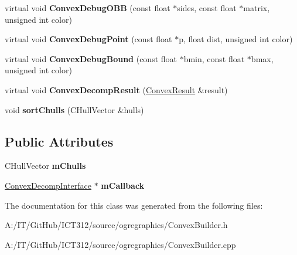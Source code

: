 \begin{DoxyCompactItemize}
\item 
\hypertarget{class_convex_builder_afb3bd186b8c5474987a8802fa3862207}{virtual void {\bfseries Convex\-Debug\-O\-B\-B} (const float $\ast$sides, const float $\ast$matrix, unsigned int color)}\label{class_convex_builder_afb3bd186b8c5474987a8802fa3862207}

\item 
\hypertarget{class_convex_builder_a27c203170b0517f2cafa230e668bfb53}{virtual void {\bfseries Convex\-Debug\-Point} (const float $\ast$p, float dist, unsigned int color)}\label{class_convex_builder_a27c203170b0517f2cafa230e668bfb53}

\item 
\hypertarget{class_convex_builder_ae70b8ed34b425867f6bd8fb0a85d63fa}{virtual void {\bfseries Convex\-Debug\-Bound} (const float $\ast$bmin, const float $\ast$bmax, unsigned int color)}\label{class_convex_builder_ae70b8ed34b425867f6bd8fb0a85d63fa}

\item 
\hypertarget{class_convex_builder_aa5ebbc3fb58777ff67f38900d54c2471}{virtual void {\bfseries Convex\-Decomp\-Result} (\hyperlink{class_convex_decomposition_1_1_convex_result}{Convex\-Result} \&result)}\label{class_convex_builder_aa5ebbc3fb58777ff67f38900d54c2471}

\item 
\hypertarget{class_convex_builder_a0bc79e8799a0c7daf3647b906e56a8c6}{void {\bfseries sort\-Chulls} (C\-Hull\-Vector \&hulls)}\label{class_convex_builder_a0bc79e8799a0c7daf3647b906e56a8c6}

\end{DoxyCompactItemize}
\subsection*{Public Attributes}
\begin{DoxyCompactItemize}
\item 
\hypertarget{class_convex_builder_a3afe639e250fe275559683d53d64cf8d}{C\-Hull\-Vector {\bfseries m\-Chulls}}\label{class_convex_builder_a3afe639e250fe275559683d53d64cf8d}

\item 
\hypertarget{class_convex_builder_a1f6f37473a9fe6abd1ea82d07d077a94}{\hyperlink{class_convex_decomposition_1_1_convex_decomp_interface}{Convex\-Decomp\-Interface} $\ast$ {\bfseries m\-Callback}}\label{class_convex_builder_a1f6f37473a9fe6abd1ea82d07d077a94}

\end{DoxyCompactItemize}


The documentation for this class was generated from the following files\-:\begin{DoxyCompactItemize}
\item 
A\-:/\-I\-T/\-Git\-Hub/\-I\-C\-T312/source/ogregraphics/Convex\-Builder.\-h\item 
A\-:/\-I\-T/\-Git\-Hub/\-I\-C\-T312/source/ogregraphics/Convex\-Builder.\-cpp\end{DoxyCompactItemize}
